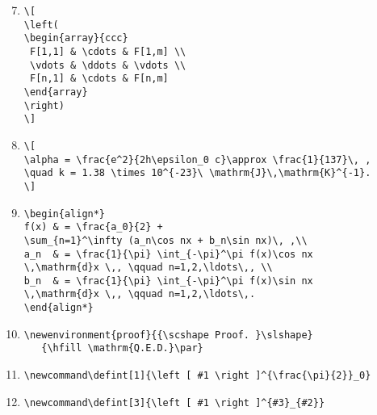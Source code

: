 \documentclass[a4paper,11pt,twoside]{article}
\begin{document}
\newpage
\noindent
\begin{enumerate}[leftmargin=*]
\setcounter{enumi}{6}
\item
\begin{verbatim}
\[
\left(
\begin{array}{ccc}
 F[1,1] & \cdots & F[1,m] \\
 \vdots & \ddots & \vdots \\
 F[n,1] & \cdots & F[n,m] 
\end{array}
\right)
\]
\end{verbatim}

\item
\begin{verbatim}
\[
\alpha = \frac{e^2}{2h\epsilon_0 c}\approx \frac{1}{137}\, ,
\quad k = 1.38 \times 10^{-23}\ \mathrm{J}\,\mathrm{K}^{-1}. 
\]
\end{verbatim}

\item
\begin{verbatim}
\begin{align*}
f(x) & = \frac{a_0}{2} + 
\sum_{n=1}^\infty (a_n\cos nx + b_n\sin nx)\, ,\\ 
a_n  & = \frac{1}{\pi} \int_{-\pi}^\pi f(x)\cos nx 
\,\mathrm{d}x \,, \qquad n=1,2,\ldots\,, \\
b_n  & = \frac{1}{\pi} \int_{-\pi}^\pi f(x)\sin nx 
\,\mathrm{d}x \,, \qquad n=1,2,\ldots\,. 
\end{align*}
\end{verbatim}

\item 
\begin{verbatim}
\newenvironment{proof}{{\scshape Proof. }\slshape}
   {\hfill \mathrm{Q.E.D.}\par} 
\end{verbatim}

\item
\begin{verbatim}
\newcommand\defint[1]{\left [ #1 \right ]^{\frac{\pi}{2}}_0}
\end{verbatim}

\item 
\begin{verbatim}
\newcommand\defint[3]{\left [ #1 \right ]^{#3}_{#2}}
\end{verbatim}

\end{enumerate}  
\end{document}
